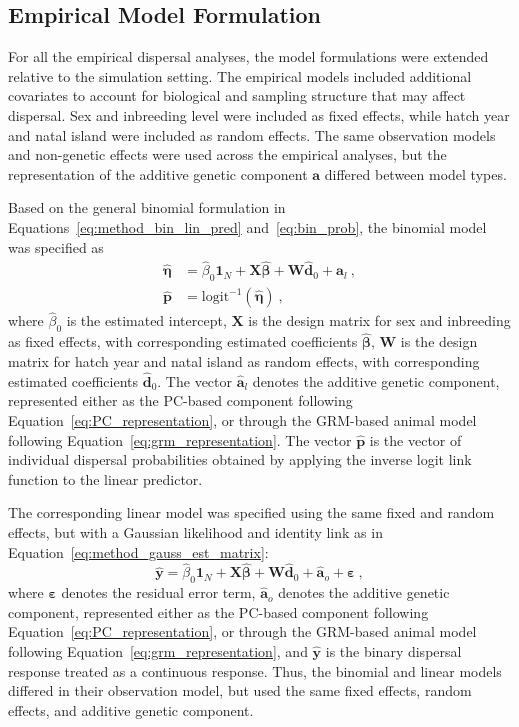 \subsection{Empirical Model Formulation}

For all the empirical dispersal analyses, the model formulations were extended relative to the simulation setting. The empirical models included additional covariates to account for biological and sampling structure that may affect dispersal. Sex and inbreeding level were included as fixed effects, while hatch year and natal island were included as random effects. The same observation models and non-genetic effects were used across the empirical analyses, but the representation of the additive genetic component $\mathbf{a}$ differed between model types.

Based on the general binomial formulation in Equations~\eqref{eq:method_bin_lin_pred} 
and~\eqref{eq:bin_prob}, the binomial model was specified as
%
\begin{align*}
    \hat{\boldsymbol{\eta}} &= \hat{\beta}_0\mathbf{1}_N + \mathbf{X}\hat{\boldsymbol{\beta}}
    + \mathbf{W}\hat{\mathbf{d}}_0 + \hat{\mathbf{a}}_l \ , \\
    \hat{\mathbf{p}} &= \text{logit}^{-1}(\hat{\boldsymbol{\eta}}) \ ,
\end{align*}
%
where $\hat{\beta}_0$ is the estimated intercept, $\mathbf{X}$ is the design matrix for sex and inbreeding as fixed effects, with corresponding estimated coefficients $\hat{\boldsymbol{\beta}}$, $\mathbf{W}$ is the design matrix for hatch year and natal island as random effects, with corresponding estimated coefficients $\hat{\mathbf{d}}_0$. The vector $\hat{\mathbf{a}}_l$ denotes the additive genetic component, represented either as the PC-based component following Equation~\eqref{eq:PC_representation}, or through the GRM-based animal model following Equation~\eqref{eq:grm_representation}. The vector $\hat{\mathbf{p}}$ is the vector of individual dispersal probabilities obtained by applying the inverse logit link function to the linear predictor.

The corresponding linear model was specified using the same fixed and random effects, 
but with a Gaussian likelihood and identity link as in Equation~\eqref{eq:method_gauss_est_matrix}:
%
\begin{equation*}
    \hat{\mathbf{y}} = \hat{\beta}_0\mathbf{1}_N + \mathbf{X}\hat{\boldsymbol{\beta}}
    + \mathbf{W}\hat{\mathbf{d}}_0 + \hat{\mathbf{a}}_o + \boldsymbol{\varepsilon} \ ,
\end{equation*}
%
where $\boldsymbol{\varepsilon}$ denotes the residual error term, $\hat{\mathbf{a}}_o$ denotes 
the additive genetic component, represented either as the PC-based component following 
Equation~\eqref{eq:PC_representation}, or through the GRM-based animal model following 
Equation~\eqref{eq:grm_representation}, and $\hat{\mathbf{y}}$ is the binary dispersal 
response treated as a continuous response. Thus, the binomial and linear models differed 
in their observation model, but used the same fixed effects, random effects, and additive 
genetic component. 

